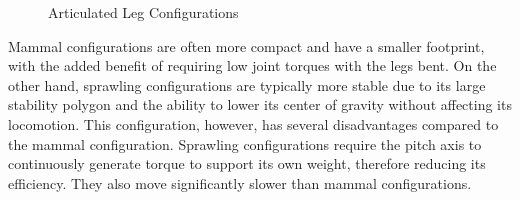 \documentclass[english]{upeeei}
\begin{document}
\begin{figure}[H]
\begin{centering}
\par\end{centering}
\begin{centering}
\par\end{centering}
\caption{Articulated Leg Configurations\label{fig:articulated-configurations}}
\end{figure}

Mammal configurations are often more compact and have a smaller footprint, with the added benefit of requiring low joint torques with the legs bent. On the other hand, sprawling configurations are typically more stable due to its large stability polygon and the ability to lower its center of gravity without affecting its locomotion. This configuration, however, has several disadvantages compared to the mammal configuration. Sprawling configurations require the pitch axis to continuously generate torque to support its own weight, therefore reducing its efficiency. They also move significantly slower than mammal configurations.
\end{document}
